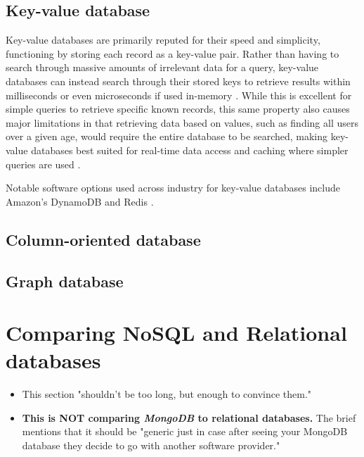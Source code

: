 \documentclass[12pt]{report}
\newcommand{\para}{\vspace{7pt}\noindent}
\begin{document}
\section{Key-value database}
Key-value databases are primarily reputed for their speed and simplicity, functioning by storing each record as a key-value pair.
Rather than having to search through massive amounts of irrelevant data for a query, key-value databases can instead search 
through their stored keys to retrieve results within milliseconds or even microseconds if used in-memory \autocite{redisRedisFAQ}.
While this is excellent for simple queries to retrieve specific known records, this same property also causes major limitations in
that retrieving data based on values, such as finding all users over a given age, would require the entire database to be searched,
making key-value databases best suited for real-time data access and caching where simpler queries are used \autocite{mongodbWhatKeyValueDatabase}.


\para Notable software options used across industry for key-value databases include Amazon's DynamoDB \autocite{awsFastNoSQLKeyValue} and Redis \autocite{redisWhatKeyValueDatabase}. 


\section{Column-oriented database}


\section{Graph database}




\chapter{Comparing NoSQL and Relational databases} 
\begin{itemize}
    \item This section "shouldn't be too long, but enough to convince them."
    \item \textbf{This is NOT comparing \textit{MongoDB} to relational databases.} The brief 
    mentions that it should be "generic just in case after seeing your MongoDB database
    they decide to go with another software provider."
\end{itemize}
\end{document}
